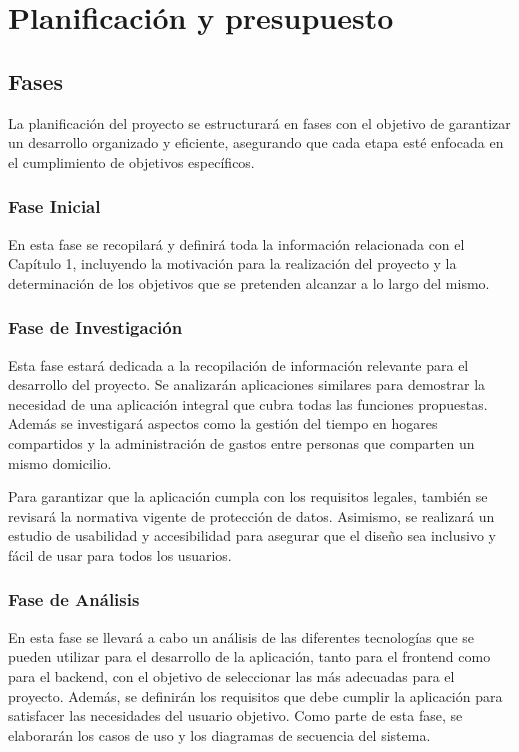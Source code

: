 \chapter{Planificación y presupuesto}
\label{cap:planificacion}

\section{Fases}
\label{sec:fases}
La planificación del proyecto se estructurará en fases con el objetivo de garantizar un desarrollo organizado y eficiente, asegurando que cada etapa esté enfocada en el cumplimiento de objetivos específicos.

\subsection{Fase Inicial}
En esta fase se recopilará y definirá toda la información relacionada con el Capítulo 1, incluyendo la motivación para la realización del proyecto y la determinación de los objetivos que se pretenden alcanzar a lo largo del mismo. 

\subsection{Fase de Investigación}
Esta fase estará dedicada a la recopilación de información relevante para el desarrollo del proyecto. Se analizarán aplicaciones similares para demostrar la necesidad de una aplicación integral que cubra todas las funciones propuestas. 
Además se investigará aspectos como la gestión del tiempo en hogares compartidos y la administración de gastos entre personas que comparten un mismo domicilio.

Para garantizar que la aplicación cumpla con los requisitos legales, también se revisará la normativa vigente de protección de datos. Asimismo, se realizará un estudio 
de usabilidad y accesibilidad para asegurar que el diseño sea inclusivo y fácil de usar para todos los usuarios.

\subsection{Fase de Análisis}
En esta fase se llevará a cabo un análisis de las diferentes tecnologías que se pueden utilizar para el desarrollo de la aplicación, tanto para el frontend como para el 
backend, con el objetivo de seleccionar las más adecuadas para el proyecto. Además, se definirán los requisitos que debe cumplir la aplicación para satisfacer las necesidades del usuario objetivo. Como
parte de esta fase, se elaborarán los casos de uso y los diagramas de secuencia del sistema.

